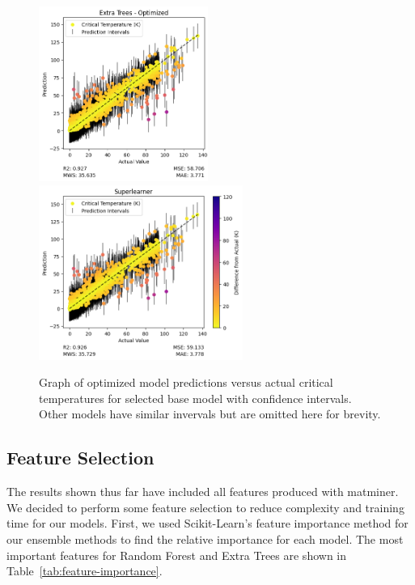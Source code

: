 \documentclass[twocolumn, nofootinbib, secnumarabic, amssymb, nobibnotes, aps, prd]{revtex4-2}
\begin{document}
\begin{figure}[!h]
    \includegraphics[height=2.25in]{images/subfigures/uncertainty/extra_trees_optimized.png}
    \includegraphics[height=2.25in]{images/subfigures/uncertainty/superlearner.png}
    \caption{Graph of optimized model predictions versus actual critical temperatures for selected base model with confidence intervals. Other models have similar invervals but are omitted here for brevity.}
    \label{fig:results-uncertainty}
\end{figure}%

\clearpage

\subsection{Feature Selection}


The results shown thus far have included all features produced with matminer. We decided to perform some feature selection to reduce complexity and training time for our models. First, we used Scikit-Learn's feature importance method for our ensemble methods to find the relative importance for each model. The most important features for Random Forest and Extra Trees are shown in Table~\ref{tab:feature-importance}. 
\end{document}
